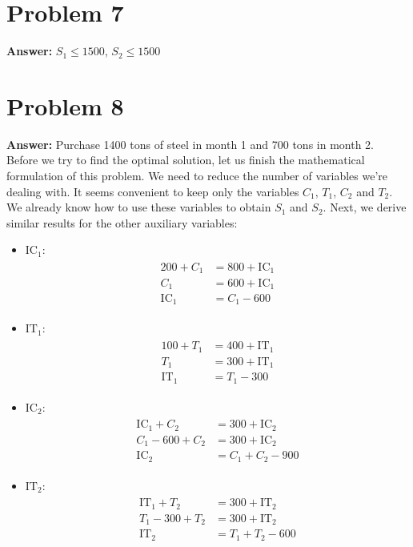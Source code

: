 \documentclass[11pt]{article}
\begin{document}
\section*{Problem 7}
\label{sec:org2c7a048}

\textbf{Answer:} \(S_1\leq 1500\), \(S_2\leq 1500\)
\section*{Problem 8}
\label{sec:org784518f}

\textbf{Answer:} Purchase 1400 tons of steel in month 1 and 700 tons in month 2.\\

Before we try to find the optimal solution, let us finish the mathematical
formulation of this problem. We need to reduce the number of variables we're
dealing with. It seems convenient to keep only the variables \(C_1\), \(T_1\),
\(C_2\) and \(T_2\). We already know how to use these variables to obtain
\(S_1\) and \(S_2\). Next, we derive similar results for the other auxiliary
variables:
\begin{itemize}
\item \(\mathrm{IC}_1\):
\begin{align}
  \begin{split}
    200+C_1&=800+\mathrm{IC}_1\\
    C_1&=600+\mathrm{IC}_1\\
    \mathrm{IC}_1&=C_1-600
  \end{split}
\end{align}
\item \(\mathrm{IT}_1\):
\begin{align}
  \begin{split}
    100+T_1&=400+\mathrm{IT}_1\\
    T_1&=300+\mathrm{IT}_1\\
    \mathrm{IT}_1&=T_1-300
  \end{split}
\end{align}
\item \(\mathrm{IC}_2\):
\begin{align}
  \begin{split}
    \mathrm{IC}_1+C_2&=300+\mathrm{IC}_2\\
    C_1-600+C_2&=300+\mathrm{IC}_2\\
    \mathrm{IC}_2&=C_1+C_2-900
  \end{split}
\end{align}
\item \(\mathrm{IT}_2\):
\begin{align}
  \begin{split}
    \mathrm{IT}_1+T_2&=300+\mathrm{IT}_2\\
    T_1-300+T_2&=300+\mathrm{IT}_2\\
    \mathrm{IT}_2&=T_1+T_2-600
  \end{split}
\end{align}
\end{itemize}
\end{document}
